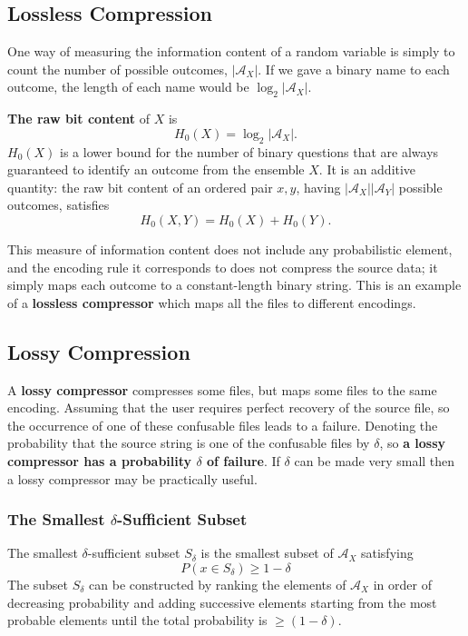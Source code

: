 \documentclass[11pt]{article}
\begin{document}
\subsection{Lossless Compression}
One way of measuring the information content of a random variable is simply to count the number of possible outcomes, $|\mathcal{A}_X|$. If we gave a binary name to each outcome, the length of each name would be $\log_2|\mathcal{A}_X|$.

\textbf{The raw bit content} of $X$ is
\[
  H_0(X) = \log_2 |\mathcal{A}_X|.
\]
$H_0(X)$ is a lower bound for the number of binary questions that are always guaranteed to identify an outcome from the ensemble $X$. It is an additive quantity: the raw bit content of an ordered pair $x,y$, having $|\mathcal{A}_X||\mathcal{A}_Y|$ possible outcomes, satisfies
\[
  H_0(X,Y) = H_0(X) + H_0(Y).
\]

This measure of information content does not include any probabilistic element, and the encoding rule it corresponds to does not compress the source data; it simply maps each outcome to a constant-length binary string. This is an example of a \textbf{lossless compressor} which maps all the files to different encodings.

\subsection{Lossy Compression}
A \textbf{lossy compressor} compresses some files, but maps some files to the same encoding. Assuming that the user requires perfect recovery of the source file, so the occurrence of one of these confusable files leads to a failure. Denoting the probability that the source string is one of the confusable files by $\delta$, so \textbf{a lossy compressor has a probability $\delta$ of failure}. If $\delta$ can be made very small then a lossy compressor may be practically useful.

\subsubsection{The Smallest $\delta$-Sufficient Subset}
The smallest $\delta$-sufficient subset $S_\delta$ is the smallest subset of $\mathcal{A}_X$ satisfying
\[
  P(x \in S_\delta) \geq 1-\delta
\]
The subset $S_\delta$ can be constructed by ranking the elements of $\mathcal{A}_X$ in order of decreasing probability and adding successive elements starting from the most probable elements until the total probability is $\geq (1-\delta)$.
\end{document}
